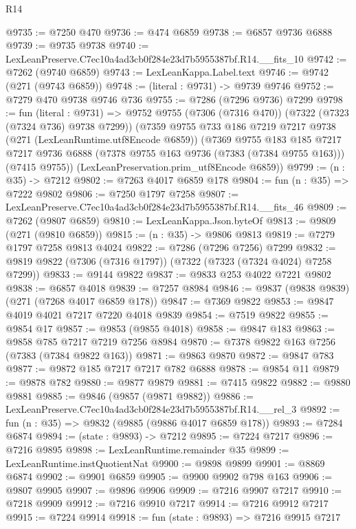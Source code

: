 \begin{lexlean}{R14}
\begin{coremodule}
@9735 := @7250 @470
@9736 := @474 @6859
@9738 := @6857 @9736 @6888
@9739 := @9735 @9738
@9740 := LexLeanPreserve.C7ec10a4ad3cb0f284e23d7b5955387bf.R14.__fits_10
@9742 := @7262 (@9740 @6859)
@9743 := LexLeanKappa.Label.text
@9746 := @9742 (@271 (@9743 @6859))
@9748 := (literal : @9731) -> @9739 @9746
@9752 := @7279 @470 @9738 @9746 @736
@9755 := @7286 (@7296 @9736) @7299
@9798 := fun (literal : @9731) =>
  @9752
    @9755
    (@7306 (@7316 @470))
    (@7322 (@7323 (@7324 @736) @9738 @7299))
    (@7359
      @9755
      @733
      @186
      @7219
      @7217
      @9738
      (@271 (LexLeanRuntime.utf8Encode @6859))
      (@7369
        @9755
        @183
        @185
        @7217
        @7217
        @9736
        @6888
        (@7378 @9755 @163 @9736 (@7383 (@7384 @9755 @163)))
        (@7415 @9755))
      (LexLeanPreservation.prim_utf8Encode @6859))
@9799 := (n : @35) -> @7212
@9802 := @7263 @4017 @6859 @178
@9804 := fun (n : @35) => @7222 @9802
@9806 := @7250 @1797 @7258
@9807 := LexLeanPreserve.C7ec10a4ad3cb0f284e23d7b5955387bf.R14.__fits_46
@9809 := @7262 (@9807 @6859)
@9810 := LexLeanKappa.Json.byteOf
@9813 := @9809 (@271 (@9810 @6859))
@9815 := (n : @35) -> @9806 @9813
@9819 := @7279 @1797 @7258 @9813 @4024
@9822 := @7286 (@7296 @7256) @7299
@9832 := @9819 @9822 (@7306 (@7316 @1797)) (@7322 (@7323 (@7324 @4024) @7258 @7299))
@9833 := @9144 @9822
@9837 := @9833 @253 @4022 @7221 @9802
@9838 := @6857 @4018
@9839 := @7257 @8984
@9846 := @9837 (@9838 @9839) (@271 (@7268 @4017 @6859 @178))
@9847 := @7369 @9822
@9853 := @9847 @4019 @4021 @7217 @7220 @4018 @9839
@9854 := @7519 @9822
@9855 := @9854 @17
@9857 := @9853 (@9855 @4018)
@9858 := @9847 @183
@9863 := @9858 @785 @7217 @7219 @7256 @8984
@9870 := @7378 @9822 @163 @7256 (@7383 (@7384 @9822 @163))
@9871 := @9863 @9870
@9872 := @9847 @783
@9877 := @9872 @185 @7217 @7217 @782 @6888
@9878 := @9854 @11
@9879 := @9878 @782
@9880 := @9877 @9879
@9881 := @7415 @9822
@9882 := @9880 @9881
@9885 := @9846 (@9857 (@9871 @9882))
@9886 := LexLeanPreserve.C7ec10a4ad3cb0f284e23d7b5955387bf.R14.__rel_3
@9892 := fun (n : @35) => @9832 (@9885 (@9886 @4017 @6859 @178))
@9893 := @7284 @6874
@9894 := (state : @9893) -> @7212
@9895 := @7224 @7217
@9896 := @7216 @9895
@9898 := LexLeanRuntime.remainder @35
@9899 := LexLeanRuntime.instQuotientNat
@9900 := @9898 @9899
@9901 := @8869 @6874
@9902 := @9901 @6859
@9905 := @9900 @9902 @798 @163
@9906 := @9807 @9905
@9907 := @9896 @9906
@9909 := @7216 @9907 @7217
@9910 := @7218 @9909
@9912 := @7216 @9910 @7217
@9914 := @7216 @9912 @7217
@9915 := @7224 @9914
@9918 := fun (state : @9893) => @7216 @9915 @7217

\end{coremodule}
\end{lexlean}
